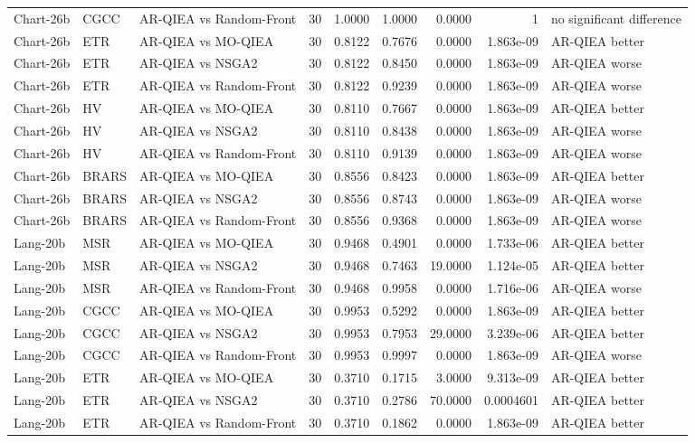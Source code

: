 \begin{tabular}{lllrrrrrl}
Chart-26b & CGCC & AR-QIEA vs Random-Front & 30 & 1.0000 & 1.0000 & 0.0000 & 1 & no significant difference \\
Chart-26b & ETR & AR-QIEA vs MO-QIEA & 30 & 0.8122 & 0.7676 & 0.0000 & 1.863e-09 & AR-QIEA better \\
Chart-26b & ETR & AR-QIEA vs NSGA2 & 30 & 0.8122 & 0.8450 & 0.0000 & 1.863e-09 & AR-QIEA worse \\
Chart-26b & ETR & AR-QIEA vs Random-Front & 30 & 0.8122 & 0.9239 & 0.0000 & 1.863e-09 & AR-QIEA worse \\
Chart-26b & HV & AR-QIEA vs MO-QIEA & 30 & 0.8110 & 0.7667 & 0.0000 & 1.863e-09 & AR-QIEA better \\
Chart-26b & HV & AR-QIEA vs NSGA2 & 30 & 0.8110 & 0.8438 & 0.0000 & 1.863e-09 & AR-QIEA worse \\
Chart-26b & HV & AR-QIEA vs Random-Front & 30 & 0.8110 & 0.9139 & 0.0000 & 1.863e-09 & AR-QIEA worse \\
Chart-26b & BRARS & AR-QIEA vs MO-QIEA & 30 & 0.8556 & 0.8423 & 0.0000 & 1.863e-09 & AR-QIEA better \\
Chart-26b & BRARS & AR-QIEA vs NSGA2 & 30 & 0.8556 & 0.8743 & 0.0000 & 1.863e-09 & AR-QIEA worse \\
Chart-26b & BRARS & AR-QIEA vs Random-Front & 30 & 0.8556 & 0.9368 & 0.0000 & 1.863e-09 & AR-QIEA worse \\
Lang-20b & MSR & AR-QIEA vs MO-QIEA & 30 & 0.9468 & 0.4901 & 0.0000 & 1.733e-06 & AR-QIEA better \\
Lang-20b & MSR & AR-QIEA vs NSGA2 & 30 & 0.9468 & 0.7463 & 19.0000 & 1.124e-05 & AR-QIEA better \\
Lang-20b & MSR & AR-QIEA vs Random-Front & 30 & 0.9468 & 0.9958 & 0.0000 & 1.716e-06 & AR-QIEA worse \\
Lang-20b & CGCC & AR-QIEA vs MO-QIEA & 30 & 0.9953 & 0.5292 & 0.0000 & 1.863e-09 & AR-QIEA better \\
Lang-20b & CGCC & AR-QIEA vs NSGA2 & 30 & 0.9953 & 0.7953 & 29.0000 & 3.239e-06 & AR-QIEA better \\
Lang-20b & CGCC & AR-QIEA vs Random-Front & 30 & 0.9953 & 0.9997 & 0.0000 & 1.863e-09 & AR-QIEA worse \\
Lang-20b & ETR & AR-QIEA vs MO-QIEA & 30 & 0.3710 & 0.1715 & 3.0000 & 9.313e-09 & AR-QIEA better \\
Lang-20b & ETR & AR-QIEA vs NSGA2 & 30 & 0.3710 & 0.2786 & 70.0000 & 0.0004601 & AR-QIEA better \\
Lang-20b & ETR & AR-QIEA vs Random-Front & 30 & 0.3710 & 0.1862 & 0.0000 & 1.863e-09 & AR-QIEA better \\

\end{tabular}
